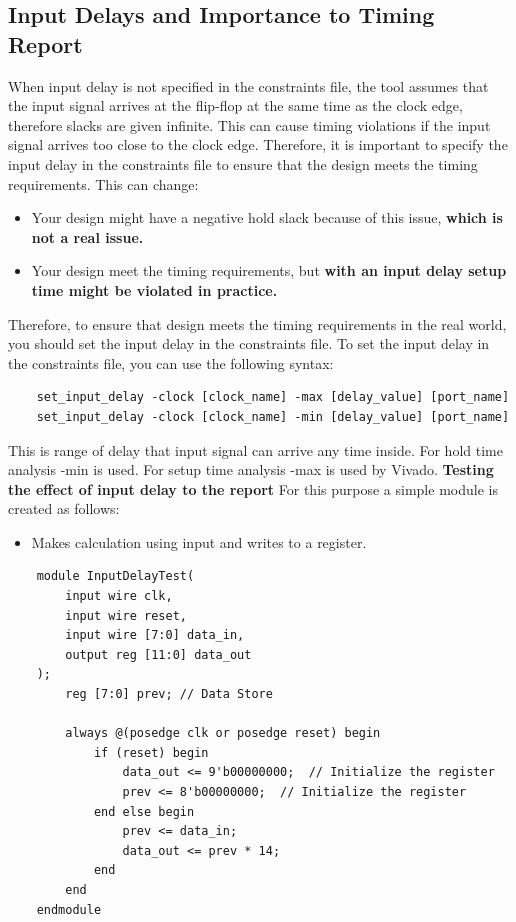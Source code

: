 \documentclass{report}
\begin{document}
\subsection{Input Delays and Importance to Timing Report}
When input delay is not specified in the constraints file, the tool assumes that the input signal arrives at the flip-flop at the same time as the clock edge, therefore slacks are given infinite. This can cause timing violations if the input signal arrives too close to the clock edge. Therefore, it is important to specify the input delay in the constraints file to ensure that the design meets the timing requirements. This can change:
\begin{itemize}
    \item Your design might have a negative hold slack because of this issue, \textbf{which is not a real issue.}
    \item Your design meet the timing requirements, but \textbf{ with an input delay setup time might be violated in practice.}
\end{itemize}
Therefore, to ensure that design meets the timing requirements in the real world, you should set the input delay in the constraints file.
To set the input delay in the constraints file, you can use the following syntax:
\begin{verbatim}
    set_input_delay -clock [clock_name] -max [delay_value] [port_name]
    set_input_delay -clock [clock_name] -min [delay_value] [port_name]
\end{verbatim}
This is range of delay that input signal can arrive any time inside. For hold time analysis -min is used. For setup time analysis -max is used by Vivado.
\textbf{Testing the effect of input delay to the report}
For this purpose a simple module is created as follows:
\begin{itemize}
    \item Makes calculation using input and writes to a register.
\end{itemize}
\begin{verbatim}
    module InputDelayTest(
        input wire clk,
        input wire reset,
        input wire [7:0] data_in,
        output reg [11:0] data_out
    );
        reg [7:0] prev; // Data Store

        always @(posedge clk or posedge reset) begin
            if (reset) begin
                data_out <= 9'b00000000;  // Initialize the register
                prev <= 8'b00000000;  // Initialize the register
            end else begin
                prev <= data_in;
                data_out <= prev * 14;
            end
        end
    endmodule
\end{verbatim}
\end{document}
